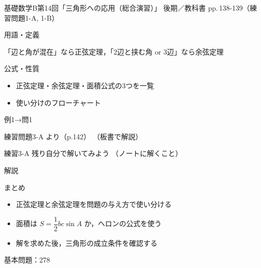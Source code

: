 \documentclass[aspectratio=43,professionalfonts,handout]{beamer}
\newcommand{\LectureNum}{14}
\newcommand{\LectureTitle}{三角形への応用（総合演習）}
\newcommand{\TextPages}{pp.\,138-139（練習問題1-A, 1-B）}
\newcommand{\CourseName}{基礎数学B}
\renewcommand{\TermName}{後期}
\begin{document}
\begin{frame}{\CourseName\quad 第\LectureNum 回「\LectureTitle 」}
  {\small \TermName\quad \TeacherName\quad ／\quad 教科書 \TextPages}

  \begin{block}{用語・定義}
  \begin{description}[labelwidth=5.5em]
    \item[\kw{使い分け：辺と角の与え方で公式を選ぶ}] 「辺と角が混在」なら正弦定理，「2辺と挟む角 or 3辺」なら余弦定理
  \end{description}
  \end{block}
\end{frame}

\begin{frame}{公式・性質}
  \begin{block}{}
  \begin{itemize}
    \item 正弦定理・余弦定理・面積公式の3つを一覧
    \item 使い分けのフローチャート
  \end{itemize}
  \end{block}
\end{frame}

\begin{frame}{例1→問1}
  \begin{exampleblock}{練習問題3-A より（p.142）}
    （板書で解説）
  \end{exampleblock}

  \vfill

  \begin{block}{練習3-A 残り\quad 自分で解いてみよう}
    （ノートに解くこと）
  \end{block}
\end{frame}

\begin{frame}{解説}
\end{frame}

\begin{frame}{まとめ}
  \begin{itemize}
    \item 正弦定理と余弦定理を問題の与え方で使い分ける
    \item 面積は $S = \dfrac{1}{2}bc\sin A$ か，ヘロンの公式を使う
    \item 解を求めた後，三角形の成立条件を確認する
  \end{itemize}

  \vfill
  {\small 基本問題：278}
\end{frame}
\end{document}

